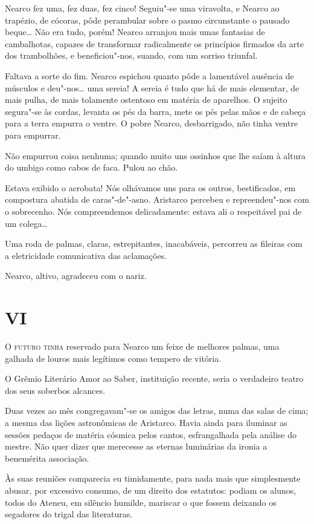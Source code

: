 Nearco fez uma, fez duas, fez cinco! Seguiu"-se
uma viravolta, e Nearco ao trapézio, de cócoras, pôde perambular sobre
o pasmo circunstante o pausado beque\ldots{} Não era tudo, porém! Nearco
arranjou mais umas fantasias de cambalhotas, capazes de transformar
radicalmente os princípios firmados da arte dos trambolhões, e
beneficiou"-nos, suando, com um sorriso triunfal. 

Faltava a sorte do
fim. Nearco espichou quanto pôde a lamentável ausência de músculos e
deu"-nos\ldots{} uma sereia! A sereia é tudo que há de mais elementar, de
mais pulha, de mais tolamente ostentoso em matéria de aparelhos. O
sujeito segura"-se às cordas, levanta os pés da barra, mete os pés
pelas mãos e de cabeça para a terra empurra o ventre. O pobre Nearco,
desbarrigado, não tinha ventre para empurrar. 

Não empurrou coisa
nenhuma; quando muito uns ossinhos que lhe saíam à altura do umbigo
como cabos de faca. Pulou ao chão. 

Estava exibido o acrobata! Nós
olhávamos uns para os outros, bestificados, em compostura abatida de
caras"-de"-asno. Aristarco percebeu e repreendeu"-nos com o
sobrecenho. Nós compreendemos delicadamente: estava ali o respeitável
pai de um colega\ldots{} 

Uma roda de palmas, claras, estrepitantes, inacabáveis, percorreu 
as fileiras com a eletricidade comunicativa das aclamações. 

Nearco, altivo, agradeceu com o nariz. 

\section{VI}

\noindent\textsc{O futuro tinha} reservado para Nearco um feixe de melhores palmas, uma
galhada de louros mais legítimos como tempero de vitória. 

O Grêmio Literário Amor ao Saber, instituição recente, seria o verdadeiro teatro
dos seus soberbos alcances. 

Duas vezes ao mês congregavam"-se os
amigos das letras, numa das salas de cima; a mesma das lições
astronômicas de Aristarco. Havia ainda para iluminar as sessões pedaços
de matéria cósmica pelos cantos, esfrangalhada pela análise do mestre.
Não quer dizer que merecesse as eternas luminárias da ironia a
benemérita associação. 

Às suas reuniões comparecia eu timidamente, para
nada mais que simplesmente abusar, por excessivo consumo, de um direito
dos estatutos: podiam os alunos, todos do Ateneu, em silêncio humilde,
mariscar o que fossem deixando os segadores do trigal das literaturas.

